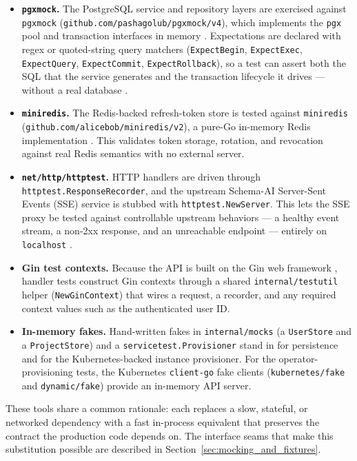 \begin{itemize}
    \item \textbf{\texttt{pgxmock}.} The PostgreSQL service and repository layers are exercised against \texttt{pgxmock} (\texttt{github.com/pashagolub/pgxmock/v4}), which implements the \texttt{pgx} pool and transaction interfaces in memory \cite{pgxmock}. Expectations are declared with regex or quoted-string query matchers (\texttt{ExpectBegin}, \texttt{ExpectExec}, \texttt{ExpectQuery}, \texttt{ExpectCommit}, \texttt{ExpectRollback}), so a test can assert both the SQL that the service generates and the transaction lifecycle it drives --- without a real database \cite{pgx_driver}.
    \item \textbf{\texttt{miniredis}.} The Redis-backed refresh-token store is tested against \texttt{miniredis} (\texttt{github.com/alicebob/miniredis/v2}), a pure-Go in-memory Redis implementation \cite{miniredis}. This validates token storage, rotation, and revocation against real Redis semantics with no external server.
    \item \textbf{\texttt{net/http/httptest}.} HTTP handlers are driven through \texttt{httptest.ResponseRecorder}, and the upstream Schema-AI Server-Sent Events (SSE) service is stubbed with \texttt{httptest.NewServer}. This lets the SSE proxy be tested against controllable upstream behaviors --- a healthy event stream, a non-2xx response, and an unreachable endpoint --- entirely on \texttt{localhost} \cite{go_testing}.
    \item \textbf{Gin test contexts.} Because the API is built on the Gin web framework \cite{gin_framework}, handler tests construct Gin contexts through a shared \texttt{internal/testutil} helper (\texttt{NewGinContext}) that wires a request, a recorder, and any required context values such as the authenticated user ID.
    \item \textbf{In-memory fakes.} Hand-written fakes in \texttt{internal/mocks} (a \texttt{UserStore} and a \texttt{ProjectStore}) and a \texttt{servicetest.Provisioner} stand in for persistence and for the Kubernetes-backed instance provisioner. For the operator-provisioning tests, the Kubernetes \texttt{client-go} fake clients (\texttt{kubernetes/fake} and \texttt{dynamic/fake}) provide an in-memory API server.
\end{itemize}

These tools share a common rationale: each replaces a slow, stateful, or networked dependency with a fast in-process equivalent that preserves the contract the production code depends on. The interface seams that make this substitution possible are described in Section~\ref{sec:mocking_and_fixtures}.
